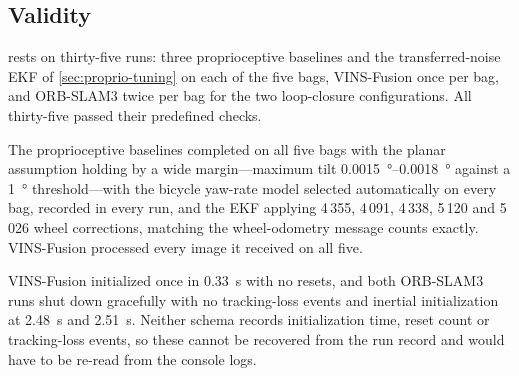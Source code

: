 \subsection{Validity}

 rests on thirty-five runs: three proprioceptive
baselines and the transferred-noise EKF of \cref{sec:proprio-tuning} on each of
the five bags, VINS-Fusion once per bag, and ORB-SLAM3 twice per bag for the two
loop-closure configurations. All thirty-five passed their predefined checks.

The proprioceptive baselines completed on all five bags with the planar
assumption holding by a wide margin---maximum tilt \SIrange{0.0015}{0.0018}{\degree}
against a \SI{1}{\degree} threshold---with the bicycle yaw-rate model selected
automatically on every bag,  recorded in every run,
and the EKF applying 4\,355, 4\,091, 4\,338, 5\,120 and 5\,026 wheel corrections,
matching the wheel-odometry message counts exactly. VINS-Fusion processed every
image it received on all five.

 VINS-Fusion initialized once in \SI{0.33}{\second} with no
resets, and both ORB-SLAM3 runs shut down gracefully with no tracking-loss events
and inertial initialization at \SI{2.48}{\second} and \SI{2.51}{\second}. Neither
 schema records initialization time, reset count or
tracking-loss events, so these cannot be recovered from the run record and would
have to be re-read from the console logs.

